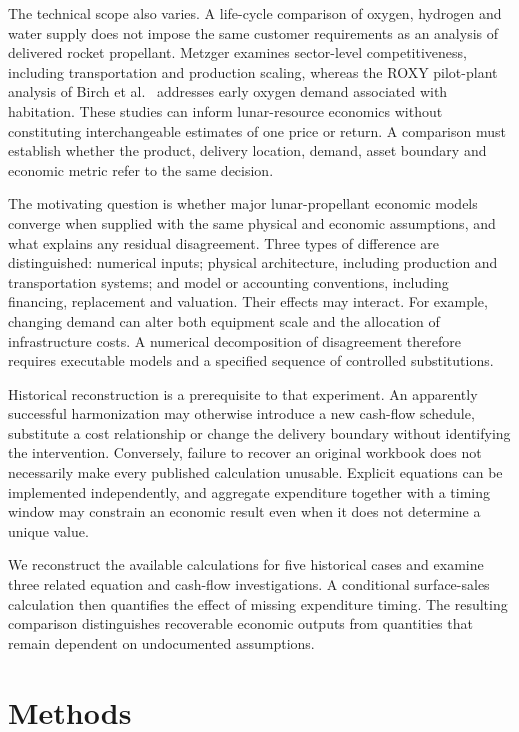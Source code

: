 \documentclass[final,5p,times,twocolumn]{elsarticle}
\begin{document}
The technical scope also varies. A life-cycle comparison of oxygen, hydrogen and water supply \cite{jones2021} does not impose the same customer requirements as an analysis of delivered rocket propellant. Metzger \cite{metzger2023} examines sector-level competitiveness, including transportation and production scaling, whereas the ROXY pilot-plant analysis of Birch et al.\ \cite{birch2026} addresses early oxygen demand associated with habitation. These studies can inform lunar-resource economics without constituting interchangeable estimates of one price or return. A comparison must establish whether the product, delivery location, demand, asset boundary and economic metric refer to the same decision.

The motivating question is whether major lunar-propellant economic models converge when supplied with the same physical and economic assumptions, and what explains any residual disagreement. Three types of difference are distinguished: numerical inputs; physical architecture, including production and transportation systems; and model or accounting conventions, including financing, replacement and valuation. Their effects may interact. For example, changing demand can alter both equipment scale and the allocation of infrastructure costs. A numerical decomposition of disagreement therefore requires executable models and a specified sequence of controlled substitutions.

Historical reconstruction is a prerequisite to that experiment. An apparently successful harmonization may otherwise introduce a new cash-flow schedule, substitute a cost relationship or change the delivery boundary without identifying the intervention. Conversely, failure to recover an original workbook does not necessarily make every published calculation unusable. Explicit equations can be implemented independently, and aggregate expenditure together with a timing window may constrain an economic result even when it does not determine a unique value.

We reconstruct the available calculations for five historical cases and examine three related equation and cash-flow investigations. A conditional surface-sales calculation then quantifies the effect of missing expenditure timing. The resulting comparison distinguishes recoverable economic outputs from quantities that remain dependent on undocumented assumptions.

\section{Methods}
\end{document}
